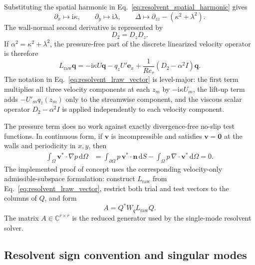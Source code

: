 \documentclass[11pt]{article}
\newcommand{\ii}{\mathrm{i}}
\newcommand{\dd}{\mathrm{d}}
\newcommand{\bfv}{\bm{v}}
\newcommand{\bfq}{\bm{q}}
\newcommand{\bfzero}{\bm{0}}
\newcommand{\Dz}{D_z}
\begin{document}
Substituting the spatial harmonic in
Eq.~\eqref{eq:resolvent_spatial_harmonic} gives
\[
  \partial_x \mapsto \ii\kappa,\qquad
  \partial_y \mapsto \ii\lambda,\qquad
  \Delta \mapsto
  \partial_{zz}-(\kappa^2+\lambda^2).
\]
The wall-normal second derivative is represented by
\begin{equation}
  D_2=\Dz\Dz.
  \label{eq:resolvent_d2_definition}
\end{equation}
If \(\alpha^2=\kappa^2+\lambda^2\), the pressure-free part of the discrete
linearized velocity operator is therefore
\begin{equation}
  L_{\mathrm{raw}}\bfq
  =
  -\ii\kappa U\bfq
  -
  q_z U'\bm{e}_x
  +
  \frac{1}{Re_{\tau}}
  \left(D_2-\alpha^2 I\right)\bfq.
  \label{eq:resolvent_lraw_vector}
\end{equation}
The notation in Eq.~\eqref{eq:resolvent_lraw_vector} is level-major: the first
term multiplies all three velocity components at each \(z_m\) by
\(-\ii\kappa U_m\), the lift-up term adds \(-U'_m q_z(z_m)\) only to the
streamwise component, and the viscous scalar operator \(D_2-\alpha^2I\) is
applied independently to each velocity component.

The pressure term does no work against exactly divergence-free no-slip test
functions. In continuous form, if \(\bfv\) is incompressible and satisfies
\(\bfv=\bfzero\) at the walls and periodicity in \(x,y\), then
\begin{align}
  \int_{\Omega}\bfv^*\cdot\nabla p\,\dd\Omega
  &=
  \int_{\partial\Omega} p\,\bfv^*\cdot\bm{n}\,\dd S
  -
  \int_{\Omega}p\,\nabla\cdot\bfv^*\,\dd\Omega
  =
  0.
  \label{eq:resolvent_pressure_orthogonality}
\end{align}
The implemented proof of concept uses the corresponding velocity-only
admissible-subspace formulation: construct \(L_{\mathrm{raw}}\) from
Eq.~\eqref{eq:resolvent_lraw_vector}, restrict both trial and test vectors to
the columns of \(Q\), and form
\begin{equation}
  A = Q^*W_qL_{\mathrm{raw}}Q.
  \label{eq:resolvent_reduced_operator}
\end{equation}
The matrix \(A\in\mathbb{C}^{r\times r}\) is the reduced generator used by
the single-mode resolvent solver.

\subsection{Resolvent sign convention and singular modes}
\end{document}
